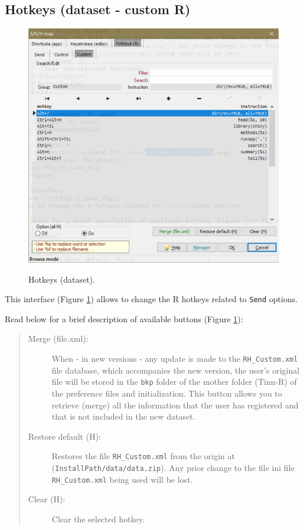 \subsection{Hotkeys (dataset - custom R)}

\begin{figure}[H]
  \includegraphics[scale=0.35]{./res/dlg_skh_map_rh_custom.png}\\
  \caption{Hotkeys (dataset).}
  \label{fig:rh_custom_dlg}
\end{figure}

This interface
(Figure \ref{fig:rh_custom_dlg})
allows to change the R hotkeys related to \texttt{Send} options.

Read below for a brief description of available buttons (Figure \ref{fig:rh_custom_dlg}):

\begin{quote}
  \begin{footnotesize}
    \begin{description}
      \item[Merge (file.xml):]
        When - in new versions - any update is made to the \texttt{RH\_Custom.xml} file database,
        which accompanies the new version, the user's original file will be stored in
        the \texttt{bkp} folder of the mother folder (Tinn-R) of the preference files and initialization.
        This button allows you to retrieve (merge) all the information that the user has registered
        and that is not included in the new dataset.
      \item[Restore default (H):]
        Restores the file \texttt{RH\_Custom.xml} from the origin at
        (\texttt{InstallPath/data/data.zip}). Any prior change to the file ini file
        \texttt{RH\_Custom.xml} being used will be lost.
      \item[Clear (H):]
        Clear the selected hotkey.
    \end{description}
  \end{footnotesize}
\end{quote}


